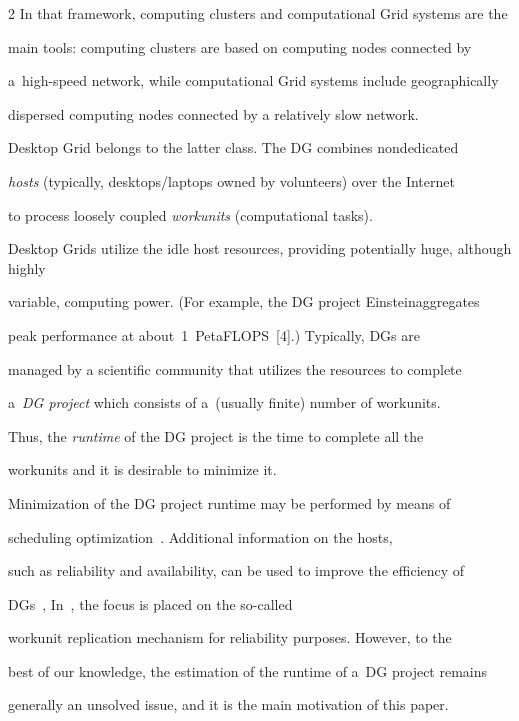 \begin{multicols}{2}
In that framework, computing clusters and computational Grid systems are the 

main tools: computing clusters are based on computing nodes connected by 

a~high-speed network, while computational Grid systems include geographically 

dispersed computing nodes connected by a relatively slow network. 



Desktop Grid belongs to the latter class. The DG combines nondedicated 

\textit{hosts} (typically, desktops/laptops owned by volunteers) over the Internet 

to process loosely coupled \textit{workunits} (computational tasks). 

Desktop Grids utilize the idle host resources, providing  potentially huge, although highly 

variable, computing power. (For example, the DG project Einstein\@HOME aggregates 

peak performance at about~1~PetaFLOPS~[4].) Typically,  DGs are 

managed by a scientific community that utilizes the resources to complete 

a~\textit{DG project} which consists of a~(usually finite) number of workunits.

 Thus, the \textit{runtime} of the DG project  is the time to complete all the 

 workunits and it is desirable to minimize it.



Minimization of the DG project runtime may be performed by means of 

scheduling optimization~\cite{6-luk-1, 7-luk-1, 8-luk-1}. Additional information on the hosts, 

such as reliability and availability, can be used to improve the efficiency of

 DGs~\cite{9-luk-1, 10-luk-1}, In~\cite{11-luk-1, 12-luk-1}, the focus is placed on the so-called 

 workunit replication mechanism for reliability purposes. However,  to the 

 best of our knowledge, the estimation of the runtime of a~DG project remains

  generally an unsolved issue, and it is the main motivation of this paper.




\end{multicols}
